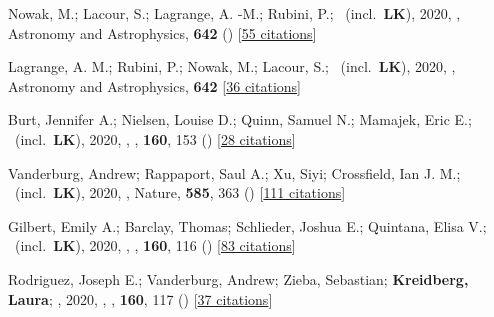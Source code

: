 \item[{\color{numcolor}\scriptsize43}] Nowak, M.; Lacour, S.; Lagrange, A. -M.; Rubini, P.; \etal\ (incl.\ \textbf{LK}), 2020, , Astronomy and Astrophysics, \textbf{642} () [\href{https://ui.adsabs.harvard.edu/abs/2020A&A...642L...2N}{55 citations}]

\item[{\color{numcolor}\scriptsize42}] Lagrange, A. M.; Rubini, P.; Nowak, M.; Lacour, S.; \etal\ (incl.\ \textbf{LK}), 2020, , Astronomy and Astrophysics, \textbf{642} [\href{https://ui.adsabs.harvard.edu/abs/2020A&A...642A..18L}{36 citations}]

\item[{\color{numcolor}\scriptsize41}] Burt, Jennifer A.; Nielsen, Louise D.; Quinn, Samuel N.; Mamajek, Eric E.; \etal\ (incl.\ \textbf{LK}), 2020, , \aj, \textbf{160}, 153 () [\href{https://ui.adsabs.harvard.edu/abs/2020AJ....160..153B}{28 citations}]

\item[{\color{numcolor}\scriptsize40}] Vanderburg, Andrew; Rappaport, Saul A.; Xu, Siyi; Crossfield, Ian J. M.; \etal\ (incl.\ \textbf{LK}), 2020, , Nature, \textbf{585}, 363 () [\href{https://ui.adsabs.harvard.edu/abs/2020Natur.585..363V}{111 citations}]

\item[{\color{numcolor}\scriptsize39}] Gilbert, Emily A.; Barclay, Thomas; Schlieder, Joshua E.; Quintana, Elisa V.; \etal\ (incl.\ \textbf{LK}), 2020, , \aj, \textbf{160}, 116 () [\href{https://ui.adsabs.harvard.edu/abs/2020AJ....160..116G}{83 citations}]

\item[{\color{numcolor}\scriptsize38}] Rodriguez, Joseph E.; Vanderburg, Andrew; Zieba, Sebastian; \textbf{Kreidberg, Laura}; \etal, 2020, , \aj, \textbf{160}, 117 () [\href{https://ui.adsabs.harvard.edu/abs/2020AJ....160..117R}{37 citations}]

